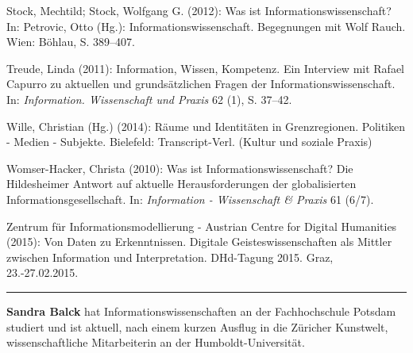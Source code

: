 \documentclass[a4paper,
fontsize=11pt,
oneside,
numbers=noperiodatend,
parskip=half-,
bibliography=totoc,
final
]{scrartcl}
\begin{document}
Stock, Mechtild; Stock, Wolfgang G. (2012): Was ist
Informationswissenschaft? In: Petrovic, Otto (Hg.):
Informationswissenschaft. Begegnungen mit Wolf Rauch. Wien: Böhlau, S.
389--407.

Treude, Linda (2011): Information, Wissen, Kompetenz. Ein Interview mit
Rafael Capurro zu aktuellen und grundsätzlichen Fragen der
Informationswissenschaft. In: \emph{Information. Wissenschaft und
Praxis} 62 (1), S. 37--42.

Wille, Christian (Hg.) (2014): Räume und Identitäten in Grenzregionen.
Politiken - Medien - Subjekte. Bielefeld: Transcript-Verl. (Kultur und
soziale Praxis)

Womser-Hacker, Christa (2010): Was ist Informationswissenschaft? Die
Hildesheimer Antwort auf aktuelle Herausforderungen der globalisierten
Informationsgesellschaft. In: \emph{Information - Wissenschaft \&
Praxis} 61 (6/7).

Zentrum für Informationsmodellierung - Austrian Centre for Digital
Humanities (2015): Von Daten zu Erkenntnissen. Digitale
Geisteswissenschaften als Mittler zwischen Information und
Interpretation. DHd-Tagung 2015. Graz, 23.-27.02.2015.

\begin{center}\rule{0.5\linewidth}{\linethickness}\end{center}

\textbf{Sandra Balck} hat Informationswissenschaften an der
Fachhochschule Potsdam studiert und ist aktuell, nach einem kurzen
Ausflug in die Züricher Kunstwelt, wissenschaftliche Mitarbeiterin an
der Humboldt-Universität.
\end{document}
